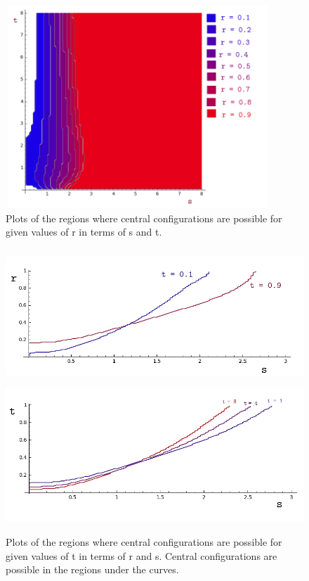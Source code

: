\documentclass[11pt,leqno]{article}
\theoremstyle{definition}
\theoremstyle{remark}
\numberwithin{equation}{section}
\begin{document}
\begin{center}

\begin{figure}
\label{rfix}
\includegraphics[width=3.9in, height=3in]{regionsRfixed.png}
 \caption{   Plots of the regions where central configurations are possible for given values of r in terms of s and t.} 
\end{figure}

\begin{figure}
\label{tfix}
\includegraphics[width=6in, height=2in]{regionstLessThan1.png}
\includegraphics[width=6in, height=2in]{regionst18.png}
 \caption{   Plots of the regions where central configurations are possible for given values of t in terms of r and s. Central configurations are possible in the regions under the curves.} 
\end{figure}

\end{center}
\end{document}
